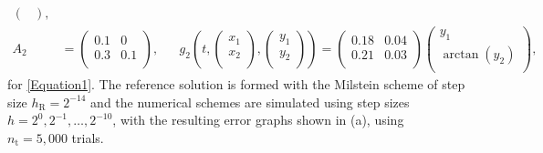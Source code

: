 \documentclass[onefignum]{siamart250211}
\begin{document}
\begin{example}
\begin{align}
\begin{pmatrix}
                      \end{pmatrix},\nonumber\\
A_2&=\begin{pmatrix}
             0.1 & 0 \\
             0.3 & 0.1 \\
           \end{pmatrix},&&g_2\left(t,\begin{pmatrix} x_1 \\ x_2 \\ \end{pmatrix},\begin{pmatrix}
           y_1 \\
           y_2 \\
         \end{pmatrix}
       \right)=\begin{pmatrix}
                     0.18 & 0.04 \\
                     0.21 & 0.03 \\
                   \end{pmatrix}\begin{pmatrix}
           y_1 \\
           \arctan(y_2) \\
         \end{pmatrix},\nonumber
\end{align}
for \cref{Equation1}. The reference solution is formed with the Milstein scheme of step size $h_\mathrm{R}=2^{-14}$ and the numerical schemes are simulated using step sizes $h=2^0,2^{-1},\ldots,2^{-10}$, with the resulting error graphs shown in  (a), using $n_\mathrm{t}=5,000$ trials.
\end{example}
\end{document}
